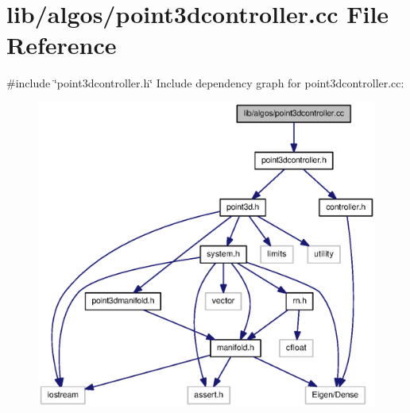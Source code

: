 \section{lib/algos/point3dcontroller.cc \-File \-Reference}
\label{point3dcontroller_8cc}
{\ttfamily \#include \char`\"{}point3dcontroller.\-h\char`\"{}}\*
\-Include dependency graph for point3dcontroller.\-cc\-:
\nopagebreak
\begin{figure}[H]
\begin{center}
\leavevmode
\includegraphics[width=350pt]{point3dcontroller_8cc__incl}
\end{center}
\end{figure}
